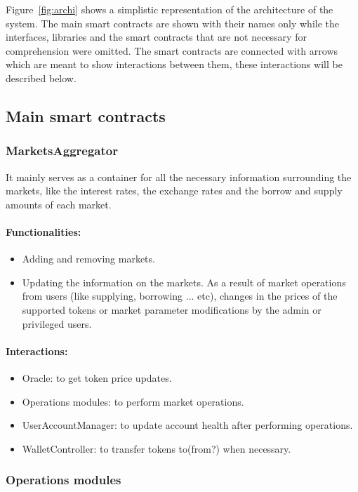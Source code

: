 Figure~\ref{fig:archi} shows a simplistic representation of the architecture of the system. The main smart contracts are shown with their names only while the interfaces, libraries and the smart contracts that are not necessary for comprehension were omitted. The smart contracts are connected with arrows which are meant to show interactions between them, these interactions will be described below.

\subsection{Main smart contracts}

\subsubsection{MarketsAggregator}

It mainly serves as a container for all the necessary information surrounding the markets, like the interest rates, the exchange rates and the borrow and supply amounts of each market.

\paragraph*{Functionalities:}
\begin{itemize}
  \item Adding and removing markets.
  \item Updating the information on the markets. As a result of market operations from users (like supplying, borrowing ... etc), changes in the prices of the supported tokens or market parameter modifications by the admin or privileged users.
\end{itemize}

\paragraph*{Interactions:}
\begin{itemize}
  \item Oracle: to get token price updates.
  \item Operations modules: to perform market operations.
  \item UserAccountManager: to update account health after performing operations.
  \item WalletController: to transfer tokens to(from?) when necessary.
\end{itemize}

\subsubsection{Operations modules}

